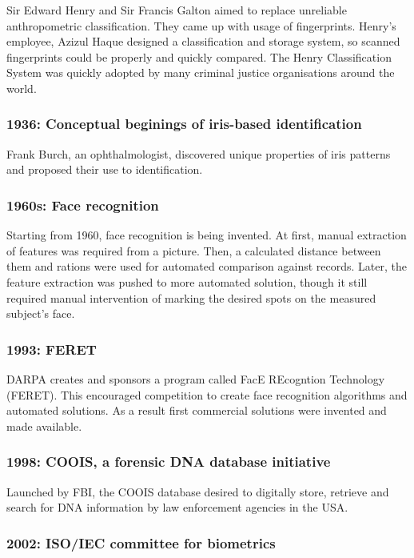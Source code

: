 Sir Edward Henry and Sir Francis Galton aimed to replace unreliable anthropometric classification. They came up with usage of fingerprints. Henry's employee, Azizul Haque designed a classification and storage system, so scanned fingerprints could be properly and quickly compared. The Henry Classification System was quickly adopted by many criminal justice organisations around the world.

\subsubsection{1936: Conceptual beginings of iris-based identification}

Frank Burch, an ophthalmologist, discovered unique properties of iris patterns and proposed their use to identification.

\subsubsection{1960s: Face recognition}

Starting from 1960, face recognition is being invented. At first, manual extraction of features was required from a picture. Then, a calculated distance between them and rations were used for automated comparison against records. Later, the feature extraction was pushed to more automated solution, though it still required manual intervention of marking the desired spots on the measured subject's face.

\subsubsection{1993: FERET}

DARPA creates and sponsors a program called FacE REcogntion Technology (FERET). This encouraged competition to create face recognition algorithms and automated solutions. As a result first commercial solutions were invented and made available.

\subsubsection{1998: COOIS, a forensic DNA database initiative}

Launched by FBI, the COOIS database desired to digitally store, retrieve and search for DNA information by law enforcement agencies in the USA.

\subsubsection{2002: ISO/IEC committee for biometrics}

